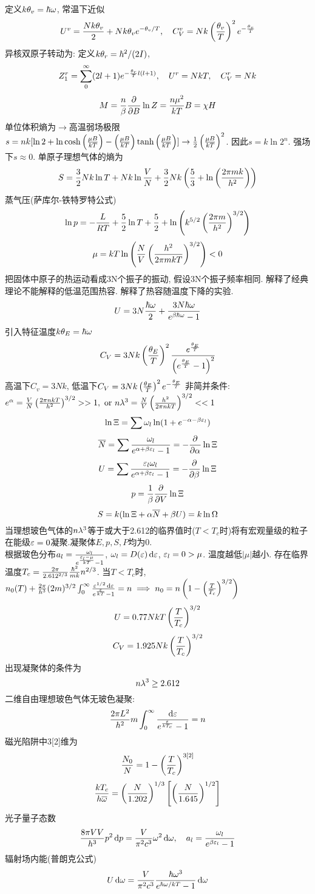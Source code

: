 \documentclass[UTF8,8pt]{ctexart}
\begin{document}
\begin{multicols}{3}
定义$k\theta_v=\hbar\omega$, 常温下近似
$$U^v=\frac{Nk\theta_v}{2}+Nk\theta_ve^{-\theta_v/T},\quad C_V^v=Nk\left( \frac{\theta_v}{T} \right)^2e^{-\frac{\theta_v}{T}}$$
异核双原子转动为: 定义$k\theta_r=\hbar^2/(2I)$,
$$Z_1^r=\sum_0^\infty(2l+1)e^{-\frac{\theta_r}{T}l(l+1)},\quad U^r=NkT,\quad C_V^r=Nk$$
$$M=\frac{n}{\beta}\frac{\partial^{} }{\partial {B}^{}}\ln Z=\frac{n\mu^2}{kT}B=\chi H$$
单位体积熵为$\to$高温弱场极限$s=nk[\ln 2+\ln \cosh\left( \frac{\mu B}{kT} \right)-\left( \frac{\mu B}{kT} \right)\tanh\left( \frac{\mu B}{kT} \right)]\to\frac{1}{2}\left( \frac{\mu B}{kT} \right)^2$. 因此$s=k\ln 2^n$. 强场下$s\approx0$. 
单原子理想气体的熵为
$$S=\frac{3}{2}Nk\ln T+Nk\ln\frac{V}{N}+\frac{3}{2}Nk\left( \frac{5}{3}+\ln\left( \frac{2\pi mk}{h^2} \right) \right)$$
蒸气压(萨库尔-铁特罗特公式)
$$\ln p=-\frac{L}{RT}+\frac{5}{2}\ln T+\frac{5}{2}+\ln\left( k^{5/2}\left( \frac{2\pi m}{h^2} \right)^{3/2} \right)$$
$$\mu=kT\ln\left( \frac{N}{V}\left( \frac{h^2}{2\pi mkT} \right)^{3/2} \right)<0$$
把固体中原子的热运动看成3N个振子的振动, 假设3N个振子频率相同. 解释了经典理论不能解释的低温范围热容. 解释了热容随温度下降的实验. 
$$U=3N\frac{\hbar\omega}{2}+\frac{3N\hbar\omega}{e^{\beta\hbar\omega}-1}$$
引入特征温度$k\theta_E=\hbar\omega$
$$C_V=3Nk\left( \frac{\theta_E}{T} \right)^2\frac{e^{\frac{\theta_E}{T}}}{\left( e^{\frac{\theta_E}{T}}-1 \right)^2}$$
高温下$C_v=3Nk$, 低温下$C_V=3Nk\left( \frac{\theta_E}{T} \right)^2e^{-\frac{\theta_E}{T}}$
非简并条件:
$e^\alpha = \frac{V}{N}\left(  \frac{2\pi nkT}{h^2}  \right)^{3/2}>>1,\ \text{or}\ n\lambda^3 = \frac{N}{V}\left( \frac{h^2}{2\pi nkT} \right)^{3/2}<<1$
$$\ln\Xi=\sum\omega_l\ln(1+e^{-\alpha-\beta\varepsilon_l})$$
$$\overline{N} = \sum \frac{\omega_l}{e^{\alpha+\beta\varepsilon_l}-1}=-\frac{\partial^{} }{\partial {\alpha}^{}}\ln\Xi$$
$$U=\sum\frac{\varepsilon_l\omega_l}{e^{\alpha+\beta\varepsilon_l}-1} = -\frac{\partial^{} }{\partial {\beta}^{}}\ln\Xi$$
$$p=\frac{1}{\beta}\frac{\partial^{} }{\partial {V}^{}}\ln\Xi$$
$$S = k(\ln\Xi+\alpha\overline{N}+\beta U)=k\ln\Omega$$
当理想玻色气体的$n\lambda^3$等于或大于2.612的临界值时($T<T_c$时)将有宏观量级的粒子在能级$\varepsilon=0$凝聚.凝聚体$E,p,S,P$均为0.\\
根据玻色分布$a_l=\frac{\omega_l}{e^{\frac{\varepsilon_l-\mu}{kT}}-1}$, $\omega_l=D(\varepsilon)\mathop{}\!\mathrm{d}\varepsilon$, $\varepsilon_l=0>\mu$. 温度越低$|\mu|$越小. 存在临界温度$T_c=\frac{2\pi}{2.612^{2/3}}\frac{\hbar^2}{mk}n^{2/3}$. 当$T<T_c$时, \\
$n_0(T)+\frac{2\pi}{h^3}(2m)^{3/2}\int_0^\infty \frac{\varepsilon^{1/2}\mathop{}\!\mathrm{d}\varepsilon}{e^{\frac{\varepsilon}{kT}}-1}=n\implies n_0=n\left( 1-\left( \frac{T}{T_c} \right)^{3/2} \right)$
$$U=0.77NkT\left( \frac{T}{T_c} \right)^{3/2}$$
$$C_V=1.925Nk\left( \frac{T}{T_c} \right)^{3/2}$$
出现凝聚体的条件为
$$n\lambda^3\geq2.612$$
二维自由理想玻色气体无玻色凝聚:
$$\frac{2\pi L^2}{h^2}m\int_0^\infty\frac{\mathop{}\!\mathrm{d}\varepsilon}{e^{\frac{\varepsilon}{kT_c}}-1}=n$$
磁光陷阱中3[2]维为
$$\frac{N_0}{N}=1-\left( \frac{T}{T_c} \right)^{3[2]}$$
$$\frac{kT_c}{h\overline{\omega}}=\left( \frac{N}{1.202} \right)^{1/3}\left[\left( \frac{N}{1.645} \right)^{1/2}\right]$$
光子量子态数
$$\frac{8\pi VV}{h^3}p^2\mathop{}\!\mathrm{d} p=\frac{V}{\pi^2c^3}\omega^2\mathop{}\!\mathrm{d}\omega,\quad a_l=\frac{\omega_l}{e^{\beta\varepsilon_l}-1}$$
辐射场内能(普朗克公式)
$$U\mathop{}\!\mathrm{d}\omega=\frac{V}{\pi^2c^3}\frac{\hbar\omega^3}{e^{\hbar\omega/kT}-1}\mathop{}\!\mathrm{d}\omega$$

\end{multicols}
\end{document}
